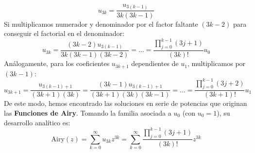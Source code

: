 \[
    u_{3k} = \frac{u_{3(k-1)}}{3k(3k-1)}
\]
Si multiplicamos numerador y denominador por el factor faltante $(3k-2)$ para conseguir el factorial en el denominador:
\[
    u_{3k} = \frac{(3k-2) u_{3(k-1)}}{3k(3k-1)(3k-2)} = \dots = \frac{\prod_{j=0}^{k-1} (3j+1)}{(3k)!} u_0
\]
Análogamente, para los coeficientes $u_{3k+1}$ dependientes de $u_1$, multiplicamos por $(3k-1)$:
\[
    u_{3k+1} = \frac{u_{3(k-1)+1}}{(3k+1)(3k)} = \frac{(3k-1) u_{3(k-1)+1}}{(3k+1)(3k)(3k-1)} = \dots = \frac{\prod_{j=0}^{k-1} (3j+2)}{(3k+1)!} u_1
\]
De este modo, hemos encontrado las soluciones en serie de potencias que originan las \textbf{Funciones de Airy}. Tomando la familia asociada a $u_0$ (con $u_0 = 1$), su desarrollo analítico es:
\[
    \text{Airy}(z) = \sum_{k=0}^{\infty} u_{3k} z^{3k} = \sum_{k=0}^{\infty} \frac{\prod_{j=0}^{k-1} (3j+1)}{(3k)!} z^{3k}
\]
